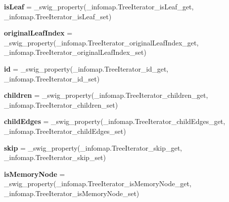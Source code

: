 \begin{DoxyCompactItemize}
{\bfseries is\+Leaf} = \+\_\+swig\+\_\+property(\+\_\+infomap.\+Tree\+Iterator\+\_\+is\+Leaf\+\_\+get, \+\_\+infomap.\+Tree\+Iterator\+\_\+is\+Leaf\+\_\+set)
\item 
\mbox{\label{classinfomapfolder_1_1infomap_1_1TreeIterator_a994fe5f24f2686ff89b0b42080aa17e7}} 
{\bfseries original\+Leaf\+Index} = \+\_\+swig\+\_\+property(\+\_\+infomap.\+Tree\+Iterator\+\_\+original\+Leaf\+Index\+\_\+get, \+\_\+infomap.\+Tree\+Iterator\+\_\+original\+Leaf\+Index\+\_\+set)
\item 
\mbox{\label{classinfomapfolder_1_1infomap_1_1TreeIterator_a55eb809613232acb6ada4897100a3b74}} 
{\bfseries id} = \+\_\+swig\+\_\+property(\+\_\+infomap.\+Tree\+Iterator\+\_\+id\+\_\+get, \+\_\+infomap.\+Tree\+Iterator\+\_\+id\+\_\+set)
\item 
\mbox{\label{classinfomapfolder_1_1infomap_1_1TreeIterator_a4338eddd73474a8dd45337348a7f4b69}} 
{\bfseries children} = \+\_\+swig\+\_\+property(\+\_\+infomap.\+Tree\+Iterator\+\_\+children\+\_\+get, \+\_\+infomap.\+Tree\+Iterator\+\_\+children\+\_\+set)
\item 
\mbox{\label{classinfomapfolder_1_1infomap_1_1TreeIterator_aa7c40d18150984344216f669a2c078ec}} 
{\bfseries child\+Edges} = \+\_\+swig\+\_\+property(\+\_\+infomap.\+Tree\+Iterator\+\_\+child\+Edges\+\_\+get, \+\_\+infomap.\+Tree\+Iterator\+\_\+child\+Edges\+\_\+set)
\item 
\mbox{\label{classinfomapfolder_1_1infomap_1_1TreeIterator_ab4c977726f972326930a1d5ac3305d76}} 
{\bfseries skip} = \+\_\+swig\+\_\+property(\+\_\+infomap.\+Tree\+Iterator\+\_\+skip\+\_\+get, \+\_\+infomap.\+Tree\+Iterator\+\_\+skip\+\_\+set)
\item 
\mbox{\label{classinfomapfolder_1_1infomap_1_1TreeIterator_a89714f89b48b276d837ceae236b5f66c}} 
{\bfseries is\+Memory\+Node} = \+\_\+swig\+\_\+property(\+\_\+infomap.\+Tree\+Iterator\+\_\+is\+Memory\+Node\+\_\+get, \+\_\+infomap.\+Tree\+Iterator\+\_\+is\+Memory\+Node\+\_\+set)
\item 

\end{DoxyCompactItemize}
